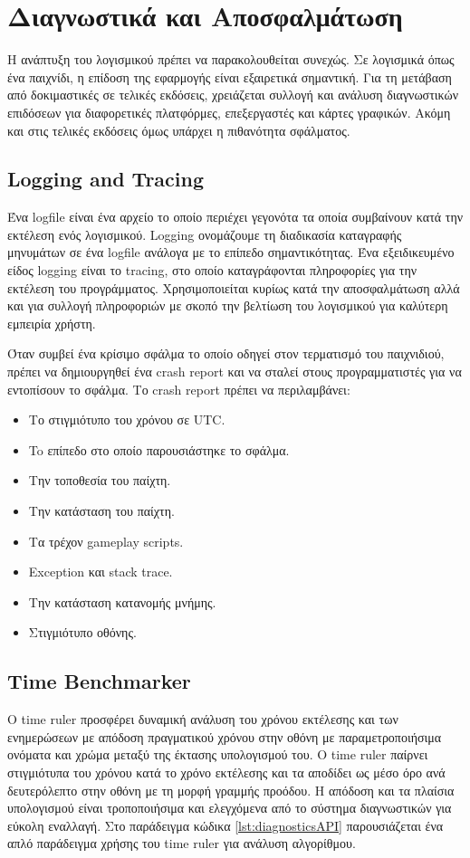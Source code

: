 \chapter{Διαγνωστικά και Αποσφαλμάτωση}
Η ανάπτυξη του λογισμικού πρέπει να παρακολουθείται συνεχώς. Σε λογισμικά όπως ένα παιχνίδι, η επίδοση της εφαρμογής είναι εξαιρετικά σημαντική. Για τη μετάβαση από δοκιμαστικές σε τελικές εκδόσεις, χρειάζεται συλλογή και ανάλυση διαγνωστικών επιδόσεων για διαφορετικές πλατφόρμες, επεξεργαστές και κάρτες γραφικών. Ακόμη και στις τελικές εκδόσεις όμως υπάρχει η πιθανότητα σφάλματος. \cite{richter2012clr}

\section{Logging and Tracing}
Ένα logfile είναι ένα αρχείο το οποίο περιέχει γεγονότα τα οποία συμβαίνουν κατά την εκτέλεση ενός λογισμικού. Logging ονομάζουμε τη διαδικασία καταγραφής μηνυμάτων σε ένα logfile ανάλογα με το επίπεδο σημαντικότητας. Ένα εξειδικευμένο είδος logging είναι το tracing, στο οποίο καταγράφονται πληροφορίες για την εκτέλεση του προγράμματος. Χρησιμοποιείται κυρίως κατά την αποσφαλμάτωση αλλά και για συλλογή πληροφοριών με σκοπό την βελτίωση του λογισμικού για καλύτερη εμπειρία χρήστη.

Όταν συμβεί ένα κρίσιμο σφάλμα το οποίο οδηγεί στον τερματισμό του παιχνιδιού, πρέπει να δημιουργηθεί ένα crash report και να σταλεί στους προγραμματιστές για να εντοπίσουν το σφάλμα.
Το crash report πρέπει να περιλαμβάνει:
\begin{itemize}
 \item Το στιγμιότυπο του χρόνου σε UTC.
 \item To επίπεδο στο οποίο παρουσιάστηκε το σφάλμα.
 \item Την τοποθεσία του παίχτη.
 \item Την κατάσταση του παίχτη.
 \item Τα τρέχον gameplay scripts.
 \item Exception και stack trace.
 \item Την κατάσταση κατανομής μνήμης.
 \item Στιγμιότυπο οθόνης.
\end{itemize}

\section{Time Benchmarker}
Ο time ruler προσφέρει δυναμική ανάλυση του χρόνου εκτέλεσης και των ενημερώσεων με απόδοση πραγματικού χρόνου στην οθόνη με παραμετροποιήσιμα ονόματα και χρώμα μεταξύ της έκτασης υπολογισμού του. O time ruler παίρνει στιγμιότυπα του χρόνου κατά το χρόνο εκτέλεσης και τα αποδίδει ως μέσο όρο ανά δευτερόλεπτο στην οθόνη με τη μορφή γραμμής προόδου.
Η απόδοση και τα πλαίσια υπολογισμού είναι τροποποιήσιμα και ελεγχόμενα από το σύστημα διαγνωστικών για εύκολη εναλλαγή. Στο παράδειγμα κώδικα \ref{lst:diagnosticsAPI} παρουσιάζεται ένα απλό παράδειγμα χρήσης του time ruler για ανάλυση αλγορίθμου.


